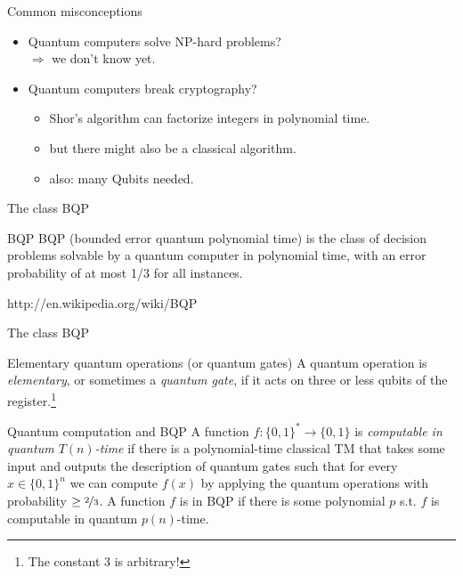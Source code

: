 \documentclass[c]{beamer}
\begin{document}

\begin{frame}{Common misconceptions}
\begin{itemize}
\item Quantum computers solve NP-hard problems? \\
$\Rightarrow$ we don't know yet.
\item Quantum computers break cryptography? \\
\begin{itemize}
\item Shor's algorithm can factorize integers in polynomial time.
\item but there might also be a classical algorithm.
\item also: many Qubits needed.
\end{itemize}
\end{itemize}
\end{frame}

\begin{frame}{The class BQP}
	\begin{block}{BQP}
		BQP (bounded error quantum polynomial time) is the class of decision problems solvable by a quantum computer in polynomial time, with an error probability of at most 1/3 for all instances.
	\end{block}
	http://en.wikipedia.org/wiki/BQP
\end{frame}

\begin{frame}{The class BQP}
	\begin{block}{Elementary quantum operations (or quantum gates)}
		A quantum operation is \emph{elementary}, or sometimes a \emph{quantum gate}, if it acts on three or less qubits of the register.\footnote{The constant 3 is arbitrary!}
	\end{block}
	
	\begin{block}{Quantum computation and BQP}
		A function $f:\{0,1\}^{*} \rightarrow \{0,1\}$ is \emph{computable in quantum $T(n)$-time} if there is a polynomial-time classical TM that takes some input and outputs the description of quantum gates such that for every $x \in \{0,1\}^{n}$ we can compute $f(x)$ by applying the quantum operations with probability $\ge \nicefrac{2}{3}$. A function $f$ is in BQP if there is some polynomial $p$ s.t. $f$ is computable in quantum $p(n)$-time.
	\end{block}
\end{frame}
\end{document}
